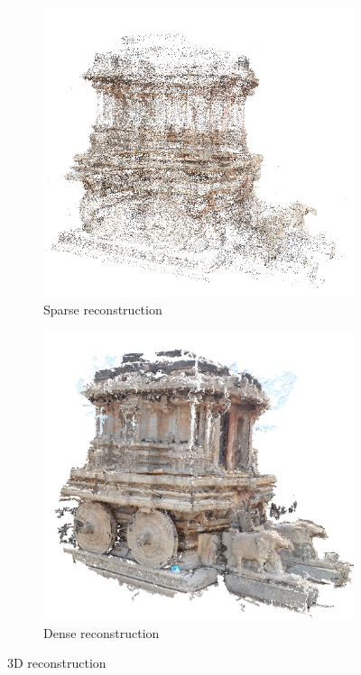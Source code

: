 \documentclass{article}
\begin{document}
		\begin{figure}[ht!]
			\centering
			\begin{subfigure}{.5\textwidth}
			  	\centering
			  	\includegraphics[width=1.0\linewidth]{sparse_chariot.png}
			  	\caption{Sparse reconstruction}
			  	\label{fig:sub1}
			\end{subfigure}%
			\begin{subfigure}{.5\textwidth}
			  	\centering
			  	\includegraphics[width=1.0\linewidth]{dense_chariot.png}
			  	\caption{Dense reconstruction}
			  	\label{fig:sub2}
			\end{subfigure}
			\caption{3D reconstruction}
			\label{figstart}
		\end{figure}
\end{document}
